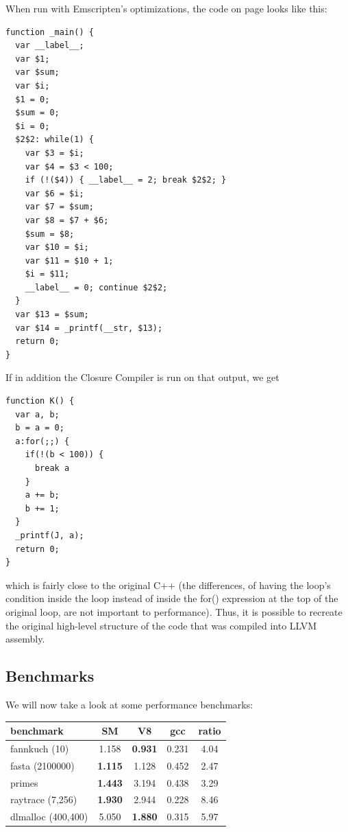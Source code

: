 \documentclass[preprint,10pt]{sigplanconf}
\begin{document}
When run with Emscripten's optimizations, the code on page \pageref{code:example} looks
like this:
\begin{verbatim}
function _main() {
  var __label__;
  var $1;
  var $sum;
  var $i;
  $1 = 0;
  $sum = 0;
  $i = 0;
  $2$2: while(1) {
    var $3 = $i;
    var $4 = $3 < 100;
    if (!($4)) { __label__ = 2; break $2$2; }
    var $6 = $i;
    var $7 = $sum;
    var $8 = $7 + $6;
    $sum = $8;
    var $10 = $i;
    var $11 = $10 + 1;
    $i = $11;
    __label__ = 0; continue $2$2;
  }
  var $13 = $sum;
  var $14 = _printf(__str, $13);
  return 0;
}
\end{verbatim}
If in addition the Closure Compiler is run on that output, we get
\begin{verbatim}
function K() {
  var a, b;
  b = a = 0;
  a:for(;;) {
    if(!(b < 100)) {
      break a
    }
    a += b;
    b += 1;
  }
  _printf(J, a);
  return 0;
}
\end{verbatim}
which is fairly close to the original C++ (the differences, of
having the loop's condition inside the loop instead of inside
the for() expression at the top of the original loop, are not important to performance). Thus, it is possible
to recreate the original high-level structure of the code that
was compiled into LLVM assembly.

\subsection{Benchmarks}
\label{sec:benchmarks}

We will now take a look at some performance benchmarks:

\bigskip

\begin{tabular}{ l | c | c | c || c }
  \hline
  \textbf{benchmark} & \textbf{SM}    & \textbf{V8}    & \textbf{gcc} & \textbf{ratio} \\
  \hline
  fannkuch (10)      & 1.158          & \textbf{0.931} & 0.231       &  4.04 \\
  fasta (2100000)    & \textbf{1.115} & 1.128          & 0.452       &  2.47 \\
  primes             & \textbf{1.443} & 3.194          & 0.438       &  3.29 \\
  raytrace (7,256)   & \textbf{1.930} & 2.944          & 0.228       &  8.46 \\
  dlmalloc (400,400) & 5.050          & \textbf{1.880} & 0.315       &  5.97 \\
  \hline
\end{tabular}
\end{document}
